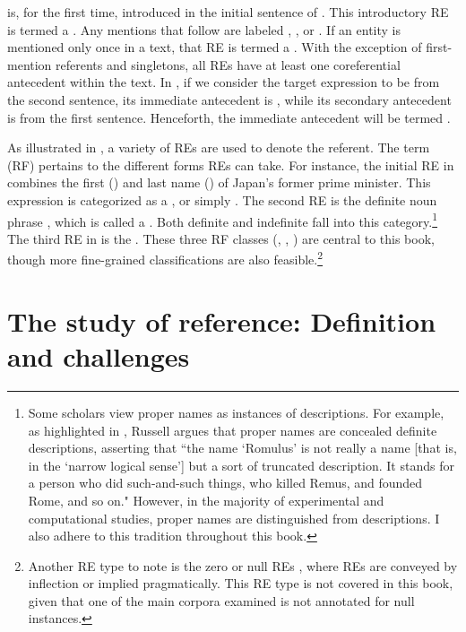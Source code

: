  is, for the first time, introduced in the initial sentence of . This introductory RE is termed a . Any mentions that follow are labeled , , or . If an entity is mentioned only once in a text, that RE is termed a  \citep{jurafsky2021speech}. With the exception of first-mention referents and singletons, all REs have at least one coreferential antecedent within the text. In , if we consider the target expression to be  from the second sentence, its immediate antecedent is , while its secondary antecedent is  from the first sentence. Henceforth, the immediate antecedent will be termed .

As illustrated in , a variety of REs are used to denote the referent. The term  (RF) pertains to the different forms REs can take. For instance, the initial RE in  combines the first () and last name () of Japan's former prime minister. This expression is categorized as a , or simply . The second RE is the definite noun phrase , which is called a . Both definite and indefinite  fall into this category.\footnote{Some scholars view proper names as instances of descriptions. For example, as highlighted in \citet{donnellan1972proper}, Russell argues that proper names are concealed definite descriptions, asserting that ``the name `Romulus' is not really a name [that is, in the `narrow logical sense'] but a sort of truncated description. It stands for a person who did such-and-such things, who killed Remus, and founded Rome, and so on." However, in the majority of experimental and computational studies, proper names are distinguished from descriptions. I also adhere to this tradition throughout this book.} The third RE in  is the  . These three RF classes (, , ) are central to this book, though more fine-grained classifications are also feasible.\footnote{Another RE type to note is the zero or null REs \citep{scott_2019}, where REs are conveyed by inflection or implied pragmatically. This RE type is not covered in this book, given that one of the main corpora examined is not annotated for null instances.}


\section{The study of reference: Definition and challenges}\label{sec:refchallenges}

